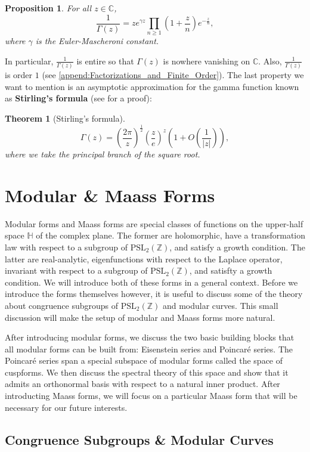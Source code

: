 \documentclass[12pt]{book}
\newtheorem{theorem}{Theorem}[section]
\newtheorem{proposition}{Proposition}[section]
\theoremstyle{definition}\newframedtheorem{method}{Method}
\newcommand{\PSL}{\mathrm{PSL}}
\newcommand{\Z}{\mathbb{Z}}
\newcommand{\C}{\mathbb{C}}
\renewcommand{\H}{\mathbb{H}}
\newcommand{\g}{\gamma}
\newcommand{\G}{\Gamma}
\newcommand{\<}{\langle}
\renewcommand{\>}{\rangle}
\begin{document}
    \begin{proposition}
      For all $z \in \C$,
      \[
        \frac{1}{\G(z)} = ze^{\g z}\prod_{n \ge 1}\left(1+\frac{z}{n}\right)e^{-\frac{z}{n}},
      \]
      where $\g$ is the Euler-Mascheroni constant.
    \end{proposition}

    In particular, $\frac{1}{\G(z)}$ is entire so that $\G(z)$ is nowhere vanishing on $\C$. Also, $\frac{1}{\G(z)}$ is order $1$ (see \cref{append:Factorizations_and_Finite_Order}). The last property we want to mention is an asymptotic approximation for the gamma function known as \textbf{Stirling's formula} (see \cite{remmert2013classical} for a proof):

    \begin{theorem}[Stirling's formula]
      \[
        \G(z) = \left(\frac{2\pi}{z}\right)^{\frac{1}{2}}\left(\frac{z}{e}\right)^{z}\left(1+O\left(\frac{1}{|z|}\right)\right),
      \]
      where we take the principal branch of the square root.
    \end{theorem}
\chapter{Modular \& Maass Forms}
  Modular forms and Maass forms are special classes of functions on the upper-half space $\H$ of the complex plane. The former are holomorphic, have a transformation law with respect to a subgroup of $\PSL_{2}(\Z)$, and satisfy a growth condition. The latter are real-analytic, eigenfunctions with respect to the Laplace operator, invariant with respect to a subgroup of $\PSL_{2}(\Z)$, and satisfty a growth condition. We will introduce both of these forms in a general context. Before we introduce the forms themselves however, it is useful to discuss some of the theory about congruence subgroups of $\PSL_{2}(\Z)$ and modular curves. This small discussion will make the setup of modular and Maass forms more natural.

  After introducing modular forms, we discuss the two basic building blocks that all modular forms can be built from: Eisenstein series and Poincar\'e series. The Poincar\'e series span a special subspace of modular forms called the space of cuspforms. We then discuss the spectral theory of this space and show that it admits an orthonormal basis with respect to a natural inner product. After introducting Maass forms, we will focus on a particular Maass form that will be necessary for our future interests.
  \section{Congruence Subgroups \& Modular Curves}
\end{document}
